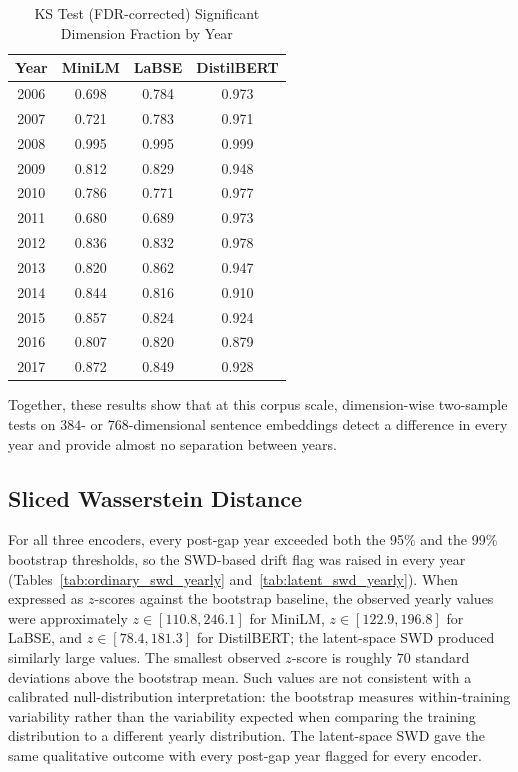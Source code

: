\documentclass[conference]{IEEEtran}
\begin{document}
\begin{table}[htbp]
\caption{KS Test (FDR-corrected) Significant Dimension Fraction by Year}
\label{tab:ks_fdr_yearly}
\begin{center}
\begin{tabular}{|c|c|c|c|}
\hline
\textbf{Year} & \textbf{MiniLM} & \textbf{LaBSE} & \textbf{DistilBERT} \\
\hline
2006 & 0.698 & 0.784 & 0.973 \\
2007 & 0.721 & 0.783 & 0.971 \\
2008 & 0.995 & 0.995 & 0.999 \\
2009 & 0.812 & 0.829 & 0.948 \\
2010 & 0.786 & 0.771 & 0.977 \\
2011 & 0.680 & 0.689 & 0.973 \\
2012 & 0.836 & 0.832 & 0.978 \\
2013 & 0.820 & 0.862 & 0.947 \\
2014 & 0.844 & 0.816 & 0.910 \\
2015 & 0.857 & 0.824 & 0.924 \\
2016 & 0.807 & 0.820 & 0.879 \\
2017 & 0.872 & 0.849 & 0.928 \\
\hline
\end{tabular}
\end{center}
\end{table}

Together, these results show that at this corpus scale, dimension-wise two-sample tests on $384$- or $768$-dimensional sentence embeddings detect a difference in every year and provide almost no separation between years.

\subsection{Sliced Wasserstein Distance}

For all three encoders, every post-gap year exceeded both the 95\% and the 99\% bootstrap thresholds, so the SWD-based drift flag was raised in every year (Tables~\ref{tab:ordinary_swd_yearly} and~\ref{tab:latent_swd_yearly}). When expressed as $z$-scores against the bootstrap baseline, the observed yearly values were approximately $z \in [110.8, 246.1]$ for MiniLM, $z \in [122.9, 196.8]$ for LaBSE, and $z \in [78.4, 181.3]$ for DistilBERT; the latent-space SWD produced similarly large values. The smallest observed $z$-score is roughly $70$ standard deviations above the bootstrap mean. Such values are not consistent with a calibrated null-distribution interpretation: the bootstrap measures within-training variability rather than the variability expected when comparing the training distribution to a different yearly distribution. The latent-space SWD gave the same qualitative outcome with every post-gap year flagged for every encoder.
\end{document}
